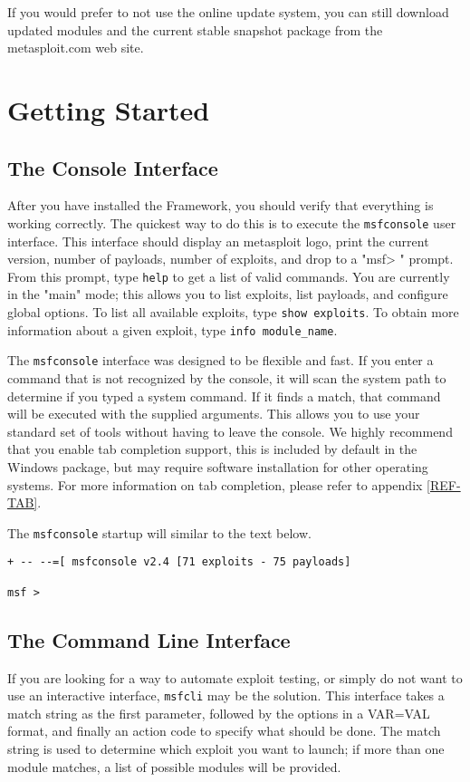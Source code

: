 \documentclass{report}
\begin{document}
\par
If you would prefer to not use the online update system, you can still download
updated modules and the current stable snapshot package from the metasploit.com
web site. 
\pagebreak


\chapter{Getting Started}

    \section{The Console Interface}
    \label{STARTED-CONSOLE}
\par
After you have installed the Framework, you should verify that everything is
working correctly.  The quickest way to do this is to execute the
\texttt{msfconsole} user interface. This interface should display an metasploit
logo, print the current version, number of payloads, number of exploits, and
drop to a "msf> " prompt. From this prompt, type \texttt{help} to get a list of
valid commands. You are currently in the "main" mode; this allows you to list
exploits, list payloads, and configure global options.  To list all available
exploits, type \texttt{show exploits}. To obtain more information about a given
exploit, type \texttt{info module\_name}. 

\par
The \texttt{msfconsole} interface was designed to be flexible and fast. If you
enter a command that is not recognized by the console, it will scan the system
path to determine if you typed a system command. If it finds a match, that
command will be executed with the supplied arguments. This allows you to use
your standard set of tools without having to leave the console. We highly
recommend that you enable tab completion support, this is included by default in
the Windows package, but may require software installation for other operating
systems. For more information on tab completion, please refer to appendix
\ref{REF-TAB}.

\par
The \texttt{msfconsole} startup will similar to the text below.

\begin{verbatim}
+ -- --=[ msfconsole v2.4 [71 exploits - 75 payloads]

msf > 
\end{verbatim}


    \section{The Command Line Interface}
    \label{STARTED-CLI}
\par
If you are looking for a way to automate exploit testing, or simply do not want
to use an interactive interface, \texttt{msfcli} may be the solution. This
interface takes a match string as the first parameter, followed by the options
in a VAR=VAL format, and finally an action code to specify what should be done.
The match string is used to determine which exploit you want to launch; if more
than one module matches, a list of possible modules will be provided. 
\end{document}

